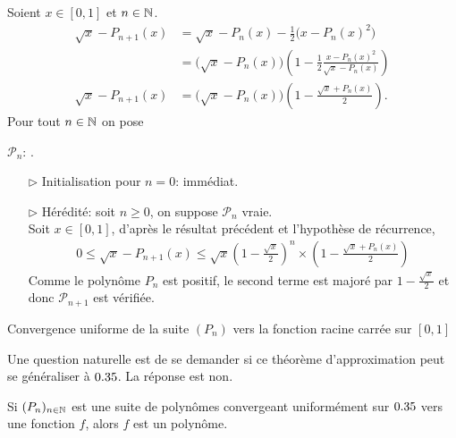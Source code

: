 \begin{solution}
    Soient $x \in [0, 1]$ et $n \in \mathbb{N}$.
    \begin{align*}
        \sqrt{x} - P_{n+1}(x) &= \sqrt{x} - P_n(x) - \frac{1}{2} \big( x - P_n(x)^2  \big) \\
        &= \big(\sqrt{x} - P_n(x) \big) \left( 1 - \frac{1}{2} \frac{x - P_n(x)^2}{\sqrt{x} - P_n(x)} \right) \\
        \sqrt{x} - P_{n+1}(x) &= \big(\sqrt{x} - P_n(x) \big) \left(1 - \frac{\sqrt{x} + P_n(x)}{2} \right).
    \end{align*}
    Pour tout $n \in \mathbb{N}$ on pose
    \begin{center}
        $\mathscr{P}_n$: .
    \end{center}
    \begin{itemize}
        \item[$\rhd$] Initialisation pour $n = 0$: immédiat.
        \item[$\rhd$] Hérédité: soit $n \geqslant 0$, on suppose $\mathscr{P}_n$ vraie. \\
        Soit $x \in [0, 1]$, d'après le résultat précédent et l'hypothèse de récurrence,
        \begin{align*}
            0 \leqslant \sqrt{x} - P_{n+1}(x) \leqslant \sqrt{x} \left( 1 - \frac{\sqrt{x}}{2}  \right)^n \times \left(1 - \frac{\sqrt{x} + P_n(x)}{2} \right)
        \end{align*}
        Comme le polynôme $P_n$ est positif, le second terme est majoré par $1 - \frac{\sqrt{x}}{2}$ et donc $\mathscr{P}_{n+1}$ est vérifiée.
    \end{itemize}
\end{solution}

\begin{marginfigure}[-5cm]
    \centering
	
	\caption*{\centering Convergence uniforme de la suite $(P_n)$ vers la fonction racine carrée sur $[0,1]$}
\end{marginfigure}

Une question naturelle est de se demander si ce théorème d'approximation peut se généraliser à $0.35$. La réponse est non.

\begin{prop}{}
    Si $(P_n)_{n \in \mathbb{N}}$ est une suite de polynômes convergeant uniformément sur $0.35$ vers une fonction $f$, alors $f$ est un polynôme.
\end{prop}

